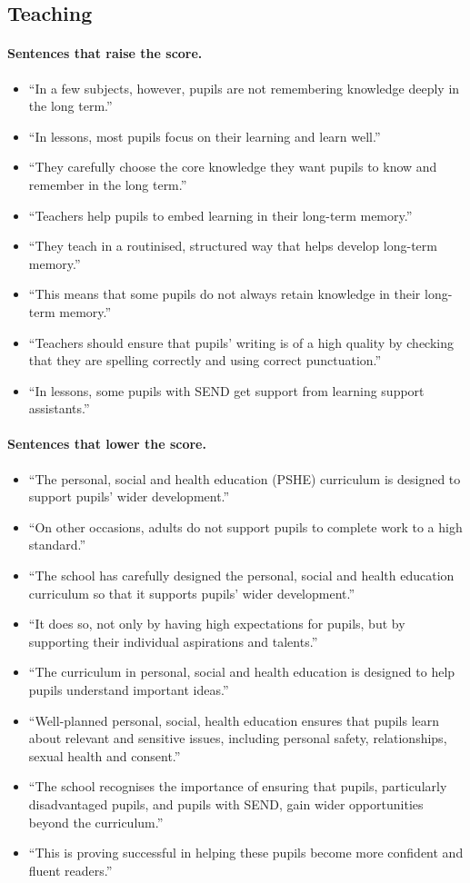 \subsection*{Teaching}
\paragraph{Sentences that raise the score.}
\begin{itemize}
  \item ``In a few subjects, however, pupils are not remembering knowledge deeply in the long term.''
  \item ``In lessons, most pupils focus on their learning and learn well.''
  \item ``They carefully choose the core knowledge they want pupils to know and remember in the long term.''
  \item ``Teachers help pupils to embed learning in their long-term memory.''
  \item ``They teach in a routinised, structured way that helps develop long-term memory.''
  \item ``This means that some pupils do not always retain knowledge in their long-term memory.''
  \item ``Teachers should ensure that pupils' writing is of a high quality by checking that they are spelling correctly and using correct punctuation.''
  \item ``In lessons, some pupils with SEND get support from learning support assistants.''
\end{itemize}
\paragraph{Sentences that lower the score.}
\begin{itemize}
  \item ``The personal, social and health education (PSHE) curriculum is designed to support pupils' wider development.''
  \item ``On other occasions, adults do not support pupils to complete work to a high standard.''
  \item ``The school has carefully designed the personal, social and health education curriculum so that it supports pupils' wider development.''
  \item ``It does so, not only by having high expectations for pupils, but by supporting their individual aspirations and talents.''
  \item ``The curriculum in personal, social and health education is designed to help pupils understand important ideas.''
  \item ``Well-planned personal, social, health education ensures that pupils learn about relevant and sensitive issues, including personal safety, relationships, sexual health and consent.''
  \item ``The school recognises the importance of ensuring that pupils, particularly disadvantaged pupils, and pupils with SEND, gain wider opportunities beyond the curriculum.''
  \item ``This is proving successful in helping these pupils become more confident and fluent readers.''
\end{itemize}
